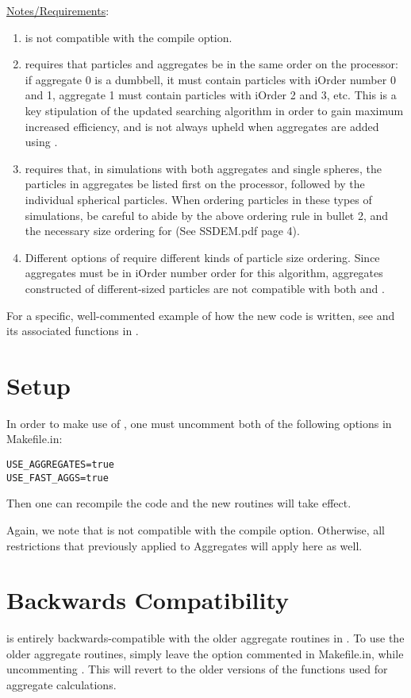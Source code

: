 \underline{Notes/Requirements}:
\begin{enumerate}
\item {} is not compatible with the  compile option.
\item {} requires that particles and aggregates be in the same order on the
processor: if aggregate 0 is a dumbbell, it must contain particles with iOrder number 0 and 1,
aggregate 1 must contain particles with iOrder 2 and 3, etc. This is a key stipulation of the
updated searching algorithm in order to gain maximum increased efficiency, and is not always
upheld when aggregates are added using .
\item {} requires that, in simulations with both aggregates and single spheres,
the particles in aggregates be listed first on the processor, followed by the individual
spherical particles. When ordering particles in these types of simulations, be careful to
abide by the above ordering rule in bullet 2, and the necessary size ordering for
 (See SSDEM.pdf page 4). 
\item Different options of  require different kinds of particle size
ordering. Since aggregates must be in iOrder number order for this algorithm, aggregates
constructed of different-sized particles are not compatible with both  and
.
\end{enumerate}
\medskip
For a specific, well-commented example of how the new code is written, see 
 and its associated functions in .

\section{Setup}
In order to make use of , one must uncomment both of
the following options in Makefile.in:
\begin{verbatim}
USE_AGGREGATES=true
USE_FAST_AGGS=true
\end{verbatim}
Then one can recompile the code and the new routines will take effect.

Again, we note that  is not compatible with the
 compile option. Otherwise, all restrictions
that previously applied to Aggregates will apply here as well.

\section{Backwards Compatibility}
 is entirely backwards-compatible with the older aggregate
routines in \pkd. To use the older aggregate routines, simply leave the
 option commented in Makefile.in, while uncommenting
. This will revert to the older versions of the
functions used for aggregate calculations.

